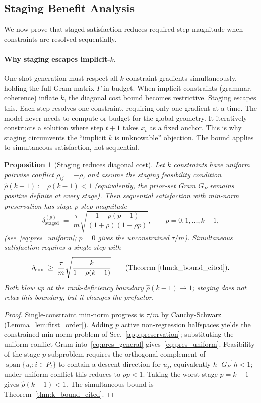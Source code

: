 \documentclass{article}
\theoremstyle{plain}
\newtheorem{proposition}[theorem]{Proposition}
\theoremstyle{definition}
\theoremstyle{remark}
\newcommand{\rhohat}{\hat{\rho}}
\newcommand{\secref}[1]{Sec.~\ref{#1}}
\begin{document}
\subsection{Staging Benefit Analysis}\label{app:staging}

We now prove that staged satisfaction reduces required step magnitude when constraints are resolved sequentially.

\paragraph{Why staging escapes implicit-$k$.} One-shot generation must respect all $k$ constraint gradients simultaneously, holding the full Gram matrix $\Gamma$ in budget. When implicit constraints (grammar, coherence) inflate $k$, the diagonal cost bound becomes restrictive. Staging escapes this. Each step resolves one constraint, requiring only one gradient at a time. The model never needs to compute or budget for the global geometry. It iteratively constructs a solution where step $t{+}1$ takes $x_t$ as a fixed anchor. This is why staging circumvents the ``implicit $k$ is unknowable'' objection. The bound applies to simultaneous satisfaction, not sequential.

\begin{proposition}[Staging reduces diagonal cost]\label{prop:staging_reduces}
Let $k$ constraints have uniform pairwise conflict $\rho_{ij} = -\rho$, and assume the staging feasibility condition $\rhohat(k-1) := \rho(k-1) < 1$ (equivalently, the prior-set Gram $G_P$ remains positive definite at every stage). Then sequential satisfaction with min-norm preservation has stage-$p$ step magnitude
\[
\delta_{\text{staged}}^{(p)} \;=\; \frac{\tau}{m}\sqrt{\frac{1-\rho(p-1)}{(1+\rho)(1-\rho p)}}, \qquad p = 0, 1, \ldots, k-1,
\]
(see~\eqref{eq:pres_uniform}; $p=0$ gives the unconstrained $\tau/m$). Simultaneous satisfaction requires a single step with
\[
\delta_{\text{sim}} \;\ge\; \frac{\tau}{m}\sqrt{\frac{k}{1-\rho(k-1)}}
\qquad \text{(Theorem~\ref{thm:k_bound_cited}).}
\]
Both blow up at the rank-deficiency boundary $\rhohat(k-1) \to 1$; staging does \emph{not} relax this boundary, but it changes the prefactor.
\end{proposition}

\begin{proof}
Single-constraint min-norm progress is $\tau/m$ by Cauchy-Schwarz (Lemma~\ref{lem:first_order}). Adding $p$ active non-regression halfspaces yields the constrained min-norm problem of \secref{app:preservation}; substituting the uniform-conflict Gram into~\eqref{eq:pres_general} gives~\eqref{eq:pres_uniform}. Feasibility of the stage-$p$ subproblem requires the orthogonal complement of $\operatorname{span}\{u_i : i \in P_t\}$ to contain a descent direction for $u_j$, equivalently $h^\top G_P^{-1} h < 1$; under uniform conflict this reduces to $\rho p < 1$. Taking the worst stage $p = k-1$ gives $\rhohat(k-1) < 1$. The simultaneous bound is Theorem~\ref{thm:k_bound_cited}.
\end{proof}
\end{document}
